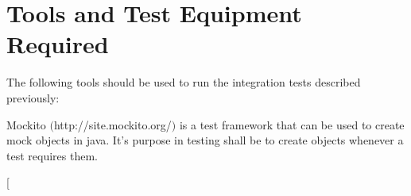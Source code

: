 \section{Tools and Test Equipment Required}

The following tools should be used to run the integration tests described previously:

\begin{description}

	\item[Mockito] Mockito $($http://site.mockito.org/$)$ is a test framework that can be used to create mock objects in java. It's purpose in testing shall be to create objects whenever
	a test requires them.
	
	\item[
	
\end{description}